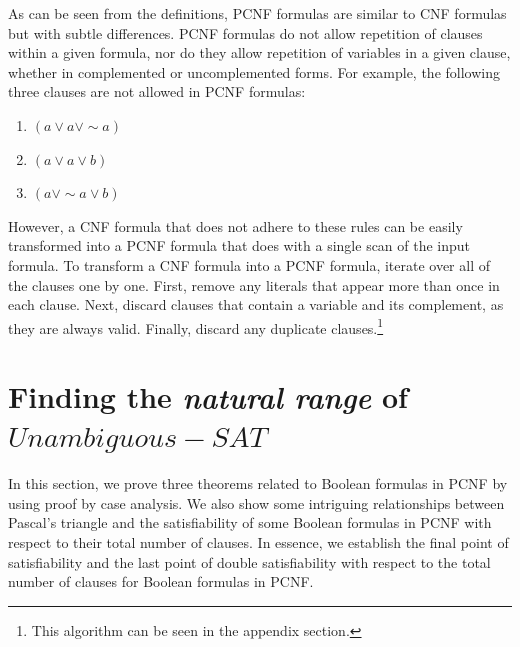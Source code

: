 \documentclass[runningheads,a4paper]{llncs}
\let\oldsim\sim
\renewcommand{\sim}{{\oldsim}}
\begin{document}
As can be seen from the definitions, PCNF formulas are similar to CNF formulas but with subtle differences. PCNF formulas do not allow repetition of clauses within a given formula, nor do they allow repetition of variables in a given clause, whether in complemented or uncomplemented forms. For example, the following three clauses are not allowed in PCNF formulas: 
\begin{enumerate}
\item $({a}\vee {a}\vee \sim {a})$ 
\item $({a} \vee {a} \vee {b})$
\item $({a} \vee \sim{a} \vee {b})$
\end{enumerate}

However, a CNF formula that does not adhere to these rules can be easily transformed into a PCNF formula that does with a single scan of the input formula. To transform a CNF formula into a PCNF formula, iterate over all of the clauses one by one. First, remove any literals that appear more than once in each clause. Next, discard clauses that contain a variable and its complement, as they are always valid. Finally, discard any duplicate clauses.\footnote{This algorithm can be seen in the appendix section.}

\section{Finding the \emph{natural range} of ${Unambiguous-SAT}$}

In this section, we prove three theorems related to Boolean formulas in PCNF by using proof by case analysis. We also show some intriguing relationships between Pascal's triangle and the satisfiability of some Boolean formulas in PCNF with respect to their total number of clauses. In essence, we establish the final point of satisfiability and the last point of double satisfiability with respect to the total number of clauses for Boolean formulas in PCNF. 
\end{document}
